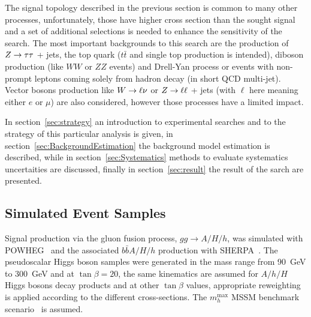 The signal topology described in the previous section is common to many other processes, unfortunately, 
those have higher cross section than the sought signal and a set of additional selections
is needed to enhance the sensitivity of the search.
The most important backgrounds to this search are the production of
 $Z\rightarrow \tau\tau $ + jets, the top quark ($t\bar{t}$ and single top production is intended), diboson production 
(like $WW$ or $ZZ$ events) and Drell-Yan process or events with non-prompt leptons coming 
solely from hadron decay (in short QCD multi-jet).
Vector bosons production like  $W\rightarrow \ell \nu$ or $Z\rightarrow \ell \ell$ + jets (with $\ell$ here meaning either $e$ or $\mu$) are also considered,
however those processes have a limited impact.


In section~\ref{sec:strategy} an introduction to experimental searches and to the strategy
of this particular analysis is given, in section~\ref{sec:BackgroundEstimation} the background model estimation is described, 
while in section~\ref{sec:Systematics} methods to evaluate systematics uncertaities are discussed, finally 
in section~\ref{sec:result} the result of the sarch are presented.


\subsection{Simulated Event Samples}
\label{sec:SimSamples}

Signal production via the gluon fusion process, $gg\rightarrow A/H/h$,
was simulated with POWHEG~\cite{POWHEG} and the associated
$b\bar{b}A/H/h$ production with SHERPA~\cite{SHERPA}.  The
pseudoscalar Higgs boson samples were generated in the mass range from
90~GeV to 300~GeV and at $\tan\beta = 20$, the same kinematics
are assumed for $A/h/H$ Higgs bosons decay products and at other
$\tan\beta$ values, appropriate reweighting is applied according to the
different cross-sections. The $m_h^{\mathrm{max}}$ MSSM benchmark
scenario~\cite{MSSMmhmax} is assumed.

